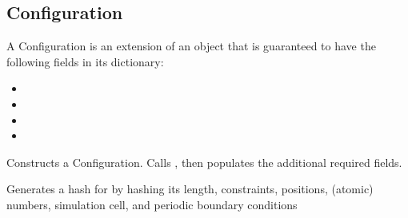 \documentclass[letterpaper,10pt,english]{sphinxmanual}
\begin{document}
\subsection{Configuration}
\label{\detokenize{configuration:configuration}}\label{\detokenize{configuration::doc}}

\begin{fulllineitems}
\label{\detokenize{configuration:colabfit.tools.configuration.Configuration}}
\sphinxAtStartPar
A Configuration is an extension of an  object that is
guaranteed to have the following fields in its  dictionary:
\begin{itemize}
\item {} 
\sphinxAtStartPar
{}

\item {} 
\sphinxAtStartPar
{}

\item {} 
\sphinxAtStartPar
{}

\item {} 
\sphinxAtStartPar
{}

\end{itemize}

\sphinxAtStartPar
Constructs a Configuration. Calls , then
populates the additional required fields.

\begin{fulllineitems}
\label{\detokenize{configuration:colabfit.tools.configuration.Configuration.__hash__}}
\sphinxAtStartPar
Generates a hash for  by hashing its length, constraints,
positions, (atomic) numbers, simulation cell, and periodic
boundary conditions


\end{fulllineitems}
\end{fulllineitems}
\end{document}
